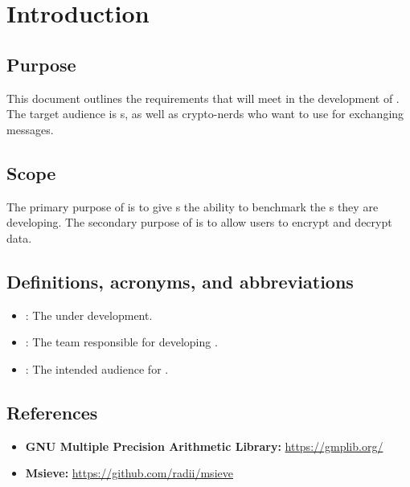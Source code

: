 \section{Introduction}
\md


\subsection{Purpose}

This document outlines the requirements that \tc{} will meet
in the development of \cry{}. The target audience is \cg s,
as well as crypto-nerds who want to use
\cry{} for exchanging messages.


\subsection{Scope}

The primary purpose of \cry{} is to give \cg s the ability
to benchmark the \cs s they are developing. The secondary
purpose of \cry{} is to allow users to encrypt and decrypt
data.


\subsection{Definitions, acronyms, and abbreviations}

\begin{itemize}
\item \cry{}: The \cf{}  under development.
\item \tc{}: The team responsible for developing \cry{}.
\item \cg : The intended audience for \cry{}.
\end{itemize}


\subsection{References}

\begin{itemize}
  \item \textbf{GNU Multiple Precision Arithmetic Library:}
        \url{https://gmplib.org/}
  \item \textbf{Msieve:} \url{https://github.com/radii/msieve}
\end{itemize}

